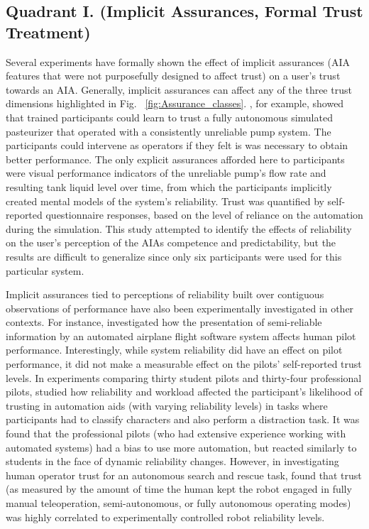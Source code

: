 \subsection{Quadrant I. (Implicit Assurances, Formal Trust Treatment)}\label{sec:q1}

Several experiments have formally shown the effect of implicit assurances (AIA features that were not purposefully designed to affect trust) on a user's trust towards an AIA. Generally, implicit assurances can affect any of the three trust dimensions highlighted in Fig. ~\ref{fig:Assurance_classes}. \citet{Muir1996-gt}, for example, showed that trained participants could learn to trust a fully autonomous simulated pasteurizer that operated with a consistently unreliable pump system. The participants could intervene as operators if they felt is was necessary to obtain better performance. The only explicit assurances afforded here to participants were visual performance indicators of the unreliable pump's flow rate and resulting tank liquid level over time, from which the participants implicitly created mental models of the system's reliability. 
Trust was quantified by self-reported questionnaire responses, based on the level of reliance on the automation during the simulation. 
This study attempted to identify the effects of reliability on the user's perception of the AIAs competence and predictability, but the results are difficult to generalize since only six participants were used for this particular system. 

Implicit assurances tied to perceptions of reliability built over contiguous observations of performance have also been experimentally investigated in other contexts. For instance, \citet{Wickens1999-la} investigated how the presentation of
semi-reliable information by an automated airplane flight software system affects human pilot performance. 
Interestingly, while system reliability did have an effect on pilot performance, it did not make a measurable effect on the pilots' self-reported trust levels. 
In experiments comparing thirty student pilots and thirty-four professional pilots, \citet{Riley1996-qm} studied how reliability and workload affected the participant's likelihood of trusting in automation aids (with varying reliability levels) in tasks where participants had to classify characters and also perform a distraction task. 
It was found that the professional pilots (who had extensive experience working with automated systems) had a bias to use more automation, but reacted similarly to students in the face of dynamic reliability changes.  
However, in investigating human operator trust for an autonomous search and rescue task, \citet{Desai2012-rc} found that trust (as measured by the amount of time the human kept the robot engaged in fully manual teleoperation, semi-autonomous, or fully autonomous operating modes) was highly correlated to experimentally controlled robot reliability levels. 


